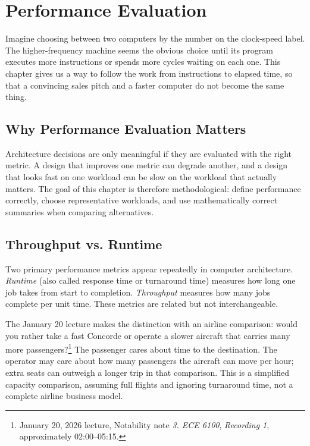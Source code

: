 \chapter{Performance Evaluation}\label{ch:auto-003}

Imagine choosing between two computers by the number on the clock-speed label.
The higher-frequency machine seems the obvious choice until its program executes more instructions or spends more cycles waiting on each one.
This chapter gives us a way to follow the work from instructions to elapsed time, so that a convincing sales pitch and a faster computer do not become the same thing.


\section{Why Performance Evaluation Matters}\label{sec:auto-010}
Architecture decisions are only meaningful if they are evaluated with the right metric.
A design that improves one metric can degrade another, and a design that looks fast on one workload can be slow on the workload that actually matters.
The goal of this chapter is therefore methodological: define performance correctly, choose representative workloads, and use mathematically correct summaries when comparing alternatives.


\section{Throughput vs. Runtime}\label{sec:auto-011}
Two primary performance metrics appear repeatedly in computer architecture.
\textit{Runtime} (also called response time or turnaround time) measures how long one job takes from start to completion.
\textit{Throughput} measures how many jobs complete per unit time.
These metrics are related but not interchangeable.

The January 20 lecture makes the distinction with an airline comparison: would you rather take a fast Concorde or operate a slower aircraft that carries many more passengers?\footnote{January 20, 2026 lecture, Notability note \emph{3. ECE 6100}, \emph{Recording 1}, approximately 02:00--05:15.}
The passenger cares about time to the destination.
The operator may care about how many passengers the aircraft can move per hour; extra seats can outweigh a longer trip in that comparison.
This is a simplified capacity comparison, assuming full flights and ignoring turnaround time, not a complete airline business model.

